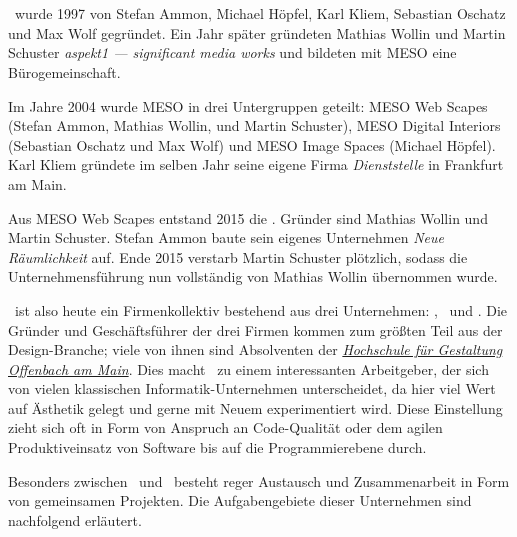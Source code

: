 \section{\meso}
\label{sec:e_meso}

\meso~wurde 1997 von Stefan Ammon, Michael Höpfel, Karl Kliem, Sebastian
Oschatz und Max Wolf gegründet. Ein Jahr später gründeten Mathias Wollin und
Martin Schuster \emph{aspekt1 --- significant media works} und bildeten mit
MESO eine Bürogemeinschaft.

Im Jahre 2004 wurde MESO in drei Untergruppen geteilt: MESO Web Scapes (Stefan
Ammon, Mathias Wollin, und Martin Schuster),
MESO Digital Interiors (Sebastian Oschatz und Max Wolf) und MESO Image Spaces
(Michael Höpfel). Karl Kliem gründete im selben Jahr seine eigene Firma
\emph{Dienststelle} in Frankfurt am Main.

Aus MESO Web Scapes entstand 2015 die \mesods. Gründer sind  Mathias Wollin und
Martin Schuster.  Stefan Ammon baute sein eigenes Unternehmen \emph{Neue
Räumlichkeit} auf.  Ende 2015 verstarb Martin Schuster plötzlich, sodass die
Unternehmensführung nun vollständig von Mathias Wollin übernommen wurde.

\meso~ist also heute ein Firmenkollektiv bestehend aus drei Unternehmen:
\mesodi, \mesods~und \mesois.  Die Gründer und Geschäftsführer der drei Firmen
kommen zum größten Teil aus der Design-Branche; viele von ihnen sind Absolventen
der \emph{\href{http://hfg-offenbach.de}{Hochschule für Gestaltung Offenbach am
Main}}.  Dies macht \meso~zu einem interessanten Arbeitgeber, der sich von
vielen klassischen Informatik-Unternehmen unterscheidet, da hier viel Wert auf
Ästhetik gelegt und gerne mit Neuem experimentiert wird.  Diese Einstellung
zieht sich oft in Form von Anspruch an Code-Qualität oder dem agilen
Produktiveinsatz von Software bis auf die Programmierebene durch.

Besonders zwischen \mesodi~und \mesods~besteht reger Austausch und
Zusammenarbeit in Form von gemeinsamen Projekten.  Die Aufgabengebiete dieser
Unternehmen sind nachfolgend erläutert.



